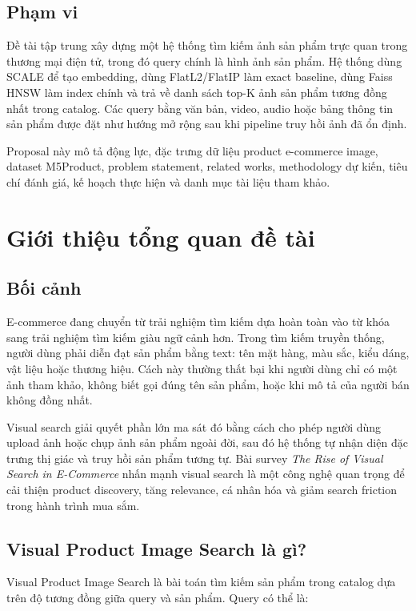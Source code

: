 \documentclass[12pt,a4paper]{article}
\begin{document}
\subsection{Phạm vi}
Đề tài tập trung xây dựng một hệ thống tìm kiếm ảnh sản phẩm trực quan trong thương mại điện tử, trong đó query chính là hình ảnh sản phẩm. Hệ thống dùng SCALE để tạo embedding, dùng FlatL2/FlatIP làm exact baseline, dùng Faiss HNSW làm index chính và trả về danh sách top-K ảnh sản phẩm tương đồng nhất trong catalog. Các query bằng văn bản, video, audio hoặc bảng thông tin sản phẩm được đặt như hướng mở rộng sau khi pipeline truy hồi ảnh đã ổn định.

Proposal này mô tả động lực, đặc trưng dữ liệu product e-commerce image, dataset M5Product, problem statement, related works, methodology dự kiến, tiêu chí đánh giá, kế hoạch thực hiện và danh mục tài liệu tham khảo.

\section{Giới thiệu tổng quan đề tài}

\subsection{Bối cảnh}
E-commerce đang chuyển từ trải nghiệm tìm kiếm dựa hoàn toàn vào từ khóa sang trải nghiệm tìm kiếm giàu ngữ cảnh hơn. Trong tìm kiếm truyền thống, người dùng phải diễn đạt sản phẩm bằng text: tên mặt hàng, màu sắc, kiểu dáng, vật liệu hoặc thương hiệu. Cách này thường thất bại khi người dùng chỉ có một ảnh tham khảo, không biết gọi đúng tên sản phẩm, hoặc khi mô tả của người bán không đồng nhất.

Visual search giải quyết phần lớn ma sát đó bằng cách cho phép người dùng upload ảnh hoặc chụp ảnh sản phẩm ngoài đời, sau đó hệ thống tự nhận diện đặc trưng thị giác và truy hồi sản phẩm tương tự. Bài survey \emph{The Rise of Visual Search in E-Commerce} nhấn mạnh visual search là một công nghệ quan trọng để cải thiện product discovery, tăng relevance, cá nhân hóa và giảm search friction trong hành trình mua sắm.

\subsection{Visual Product Image Search là gì?}
Visual Product Image Search là bài toán tìm kiếm sản phẩm trong catalog dựa trên độ tương đồng giữa query và sản phẩm. Query có thể là:
\end{document}
